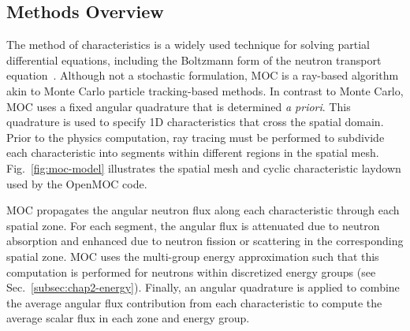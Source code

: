 \subsection{Methods Overview}
\label{subsubsec:chap4-openmoc-overview}

The method of characteristics is a widely used technique for solving partial differential equations, including the Boltzmann form of the neutron transport equation~\cite{askew1972moc}. Although not a stochastic formulation, \ac{MOC} is a ray-based algorithm akin to Monte Carlo particle tracking-based methods. In contrast to Monte Carlo, \ac{MOC} uses a fixed angular quadrature that is determined \textit{a priori}. This quadrature is used to specify 1D characteristics that cross the spatial domain. Prior to the physics computation, ray tracing must be performed to subdivide each characteristic into segments within different regions in the spatial mesh. Fig.~\ref{fig:moc-model} illustrates the spatial mesh and cyclic characteristic laydown used by the OpenMOC code.

\ac{MOC} propagates the angular neutron flux along each characteristic through each spatial zone. For each segment, the angular flux is attenuated due to neutron absorption and enhanced due to neutron fission or scattering in the corresponding spatial zone. \ac{MOC} uses the multi-group energy approximation such that this computation is performed for neutrons within discretized energy groups (see Sec.~\ref{subsec:chap2-energy}). Finally, an angular quadrature is applied to combine the average angular flux contribution from each characteristic to compute the average scalar flux in each zone and energy group.

